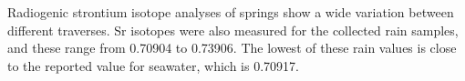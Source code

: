 \FloatBarrier


Radiogenic strontium isotope analyses of springs show a wide variation between different traverses. Sr isotopes were also measured for the collected rain samples, and these range from 0.70904 to 0.73906. The lowest of these rain values is close to the reported value for seawater, which is 0.70917.  